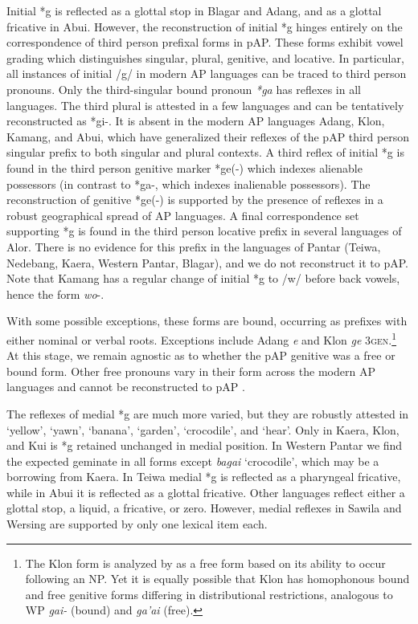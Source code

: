 Initial *g is reflected as a glottal stop in Blagar and Adang, and as a glottal fricative in Abui. However, the reconstruction of initial *g hinges entirely on the correspondence of third person prefixal forms in pAP. These forms exhibit vowel grading which distinguishes singular, plural, genitive, and locative. In particular, all instances of initial /g/ in modern AP languages can be traced to third person pronouns. Only the third-singular bound pronoun \textit{*ga }has reflexes in all languages. The third plural is attested in a few languages and can be tentatively reconstructed as *gi-. It is absent in the modern AP languages Adang, Klon, Kamang, and Abui, which have generalized their reflexes of the pAP third person singular prefix to both singular and plural contexts. A third reflex of initial *g is found in the third person genitive marker *ge(-) which indexes alienable possessors (in contrast to *ga-, which indexes inalienable possessors). The reconstruction of genitive *ge(-) is supported by the
presence of reflexes in a robust geographical spread of AP languages. A final correspondence set supporting *g is found in the third person locative prefix in several languages of Alor. There is no evidence for this prefix in the languages of Pantar (Teiwa, Nedebang, Kaera, Western Pantar, Blagar), and we do not reconstruct it to pAP. Note that Kamang has a regular change of initial *g to /w/ before back vowels, hence the form \textit{wo}{}-.

With some possible exceptions, these forms are bound, occurring as prefixes with either nominal or verbal roots. Exceptions include Adang \textit{{\textglotstop}}\textit{e} and Klon \textit{ge} 3\textsc{gen.}\footnote{ The Klon form is analyzed by \citet{Baird2008} as a free form based on its ability to occur following an NP. Yet it is equally possible that Klon has homophonous bound and free genitive forms differing in distributional restrictions, analogous to WP \textit{gai-} (bound) and \textit{ga'ai} (free).} At this stage, we remain agnostic as to whether the pAP genitive was a free or bound form. Other free pronouns vary in their form across the modern AP languages and cannot be reconstructed to pAP \citep{KratochvilEtAl2011}.

The reflexes of medial *g are much more varied, but they are robustly attested in `yellow', `yawn', `banana', `garden', `crocodile', and `hear'. Only in Kaera, Klon, and Kui is *g retained unchanged in medial position. In Western Pantar we find the expected geminate in all forms except \textit{bagai} `crocodile', which may be a borrowing from Kaera. In Teiwa medial *g is reflected as a pharyngeal fricative, while in Abui it is reflected as a glottal fricative. Other languages reflect either a glottal stop, a liquid, a fricative, or zero. However, medial reflexes in Sawila and Wersing are supported by only one lexical item each.


